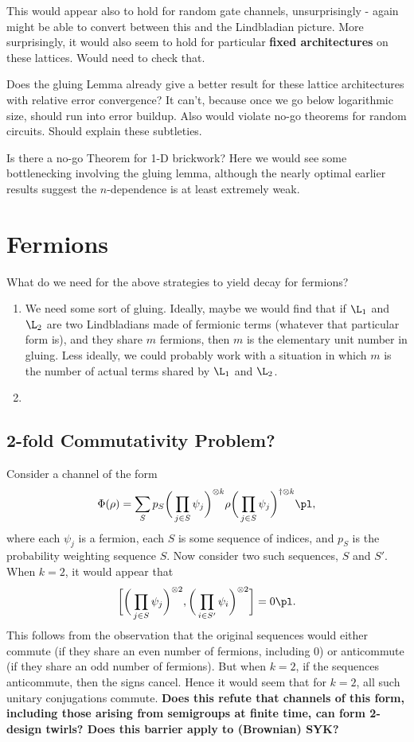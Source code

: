 {\color{blue} This would appear also to hold for random gate channels, unsurprisingly - again might be able to convert between this and the Lindbladian picture. More surprisingly, it would also seem to hold for particular \textbf{fixed architectures} on these lattices. Would need to check that.

Does the gluing Lemma already give a better result for these lattice architectures with relative error convergence? It can't, because once we go below logarithmic size, should run into error buildup. Also would violate no-go theorems for random circuits. Should explain these subtleties.

Is there a no-go Theorem for 1-D brickwork? Here we would see some bottlenecking involving the gluing lemma, although the nearly optimal earlier results suggest the $n$-dependence is at least extremely weak.}

\section{Fermions}
What do we need for the above strategies to yield decay for fermions?
\begin{enumerate}
    \item We need some sort of gluing. Ideally, maybe we would find that if $\L_1$ and $\L_2$ are two Lindbladians made of fermionic terms (whatever that particular form is), and they share $m$ fermions, then $m$ is the elementary unit number in gluing. Less ideally, we could probably work with a situation in which $m$ is the number of actual terms shared by $\L_1$ and $\L_2$.
    \item 
\end{enumerate}
\color{blue}
\subsection{2-fold Commutativity Problem?}
Consider a channel of the form
\begin{equation}
    \Phi(\rho) = \sum_S p_S \bigg ( \prod_{j \in S} \psi_j \bigg)^{\otimes k} \rho \bigg ( \prod_{j \in S} \psi_j \bigg)^{\dagger \otimes k} \pl,
\end{equation}
where each $\psi_j$ is a fermion, each $S$ is some sequence of indices, and $p_S$ is the probability weighting sequence $S$. Now consider two such sequences, $S$ and $S'$. When $k = 2$, it would appear that
\begin{equation}
    \bigg [ \bigg ( \prod_{j \in S} \psi_j \bigg)^{\otimes 2}, \bigg ( \prod_{i \in S'} \psi_i \bigg )^{\otimes 2} \bigg ] = 0 \pl.
\end{equation}
This follows from the observation that the original sequences would either commute (if they share an even number of fermions, including 0) or anticommute (if they share an odd number of fermions). But when $k = 2$, if the sequences anticommute, then the signs cancel. Hence it would seem that for $k=2$, all such unitary conjugations commute. \textbf{Does this refute that channels of this form, including those arising from semigroups at finite time, can form 2-design twirls? Does this barrier apply to (Brownian) SYK?}

